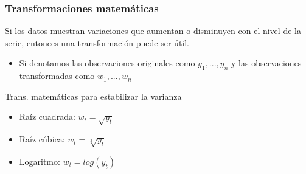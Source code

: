 \documentclass[10pt]{beamer}
\begin{document}
\begin{frame}[fragile]
\frametitle{Transformaciones matemáticas}

Si los datos muestran variaciones que aumentan o disminuyen con el nivel de la serie, entonces una transformación puede ser útil.


\vspace{4mm}
\pause

\begin{itemize}
\item Si denotamos las observaciones originales como $y_1, ..., y_n$ y las observaciones transformadas como $w_1, ..., w_n$
\end{itemize}

\vspace{3mm}
\pause


\begin{block}{Trans. matemáticas para estabilizar la varianza}

\begin{itemize}
\item Raíz cuadrada: \hspace{5mm} $w_t = \sqrt{y_t}$
\item Raíz cúbica: \hspace{8mm} $w_t = \sqrt[3]{y_t}$
\item Logaritmo: \hspace{10mm} $w_t = log(y_t)$
\end{itemize}


\end{block}

\vspace{4mm}
\pause

{\small {}
}

\end{frame}


\end{document}
